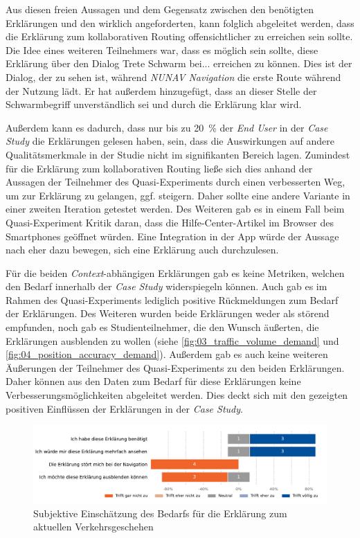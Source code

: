 Aus diesen freien Aussagen und dem Gegensatz zwischen den benötigten Erklärungen und den wirklich angeforderten, kann folglich abgeleitet werden, dass die Erklärung zum kollaborativen Routing offensichtlicher zu erreichen sein sollte. Die Idee eines weiteren Teilnehmers war, dass es möglich sein sollte, diese Erklärung über den Dialog \glqq Trete Schwarm bei...\grqq{} erreichen zu können. Dies ist der Dialog, der zu sehen ist, während \textit{NUNAV Navigation} die erste Route während der Nutzung lädt. Er hat außerdem hinzugefügt, dass an dieser Stelle der Schwarmbegriff unverständlich sei und durch die Erklärung klar wird.

Außerdem kann es dadurch, dass nur bis zu 20~\% der \textit{End User} in der \textit{Case Study} die Erklärungen gelesen haben, sein, dass die Auswirkungen auf andere Qualitätsmerkmale in der Studie nicht im signifikanten Bereich lagen. Zumindest für die Erklärung zum kollaborativen Routing ließe sich dies anhand der Aussagen der Teilnehmer des Quasi-Experiments durch einen verbesserten Weg, um zur Erklärung zu gelangen, ggf. steigern. Daher sollte eine andere Variante in einer zweiten Iteration getestet werden. Des Weiteren gab es in einem Fall beim Quasi-Experiment Kritik daran, dass die Hilfe-Center-Artikel im Browser des Smartphones geöffnet würden. Eine Integration in der App würde der Aussage nach eher dazu bewegen, sich eine Erklärung auch durchzulesen.

Für die beiden \textit{Context}-abhängigen Erklärungen gab es keine Metriken, welchen den Bedarf innerhalb der \textit{Case Study} widerspiegeln können. Auch gab es im Rahmen des Quasi-Experiments lediglich positive Rückmeldungen zum Bedarf der Erklärungen. Des Weiteren wurden beide Erklärungen weder als störend empfunden, noch gab es Studienteilnehmer, die den Wunsch äußerten, die Erklärungen ausblenden zu wollen (siehe \autoref{fig:03_traffic_volume_demand} und \autoref{fig:04_position_accuracy_demand}). Außerdem gab es auch keine weiteren Äußerungen der Teilnehmer des Quasi-Experiments zu den beiden Erklärungen. Daher können aus den Daten zum Bedarf für diese Erklärungen keine Verbesserungsmöglichkeiten abgeleitet werden. Dies deckt sich mit den gezeigten positiven Einflüssen der Erklärungen in der \textit{Case Study}.

\begin{figure}[htb!]
    \centering
    \includegraphics[width=\textwidth]{contents/06_model_evaluation/02_evaluation/res/qualitativeFeedback-03_traffic_volume_demand.pdf}
    \caption{Subjektive Einschätzung des Bedarfs für die Erklärung zum aktuellen Verkehrsgeschehen}
    \label{fig:03_traffic_volume_demand}
\end{figure}


